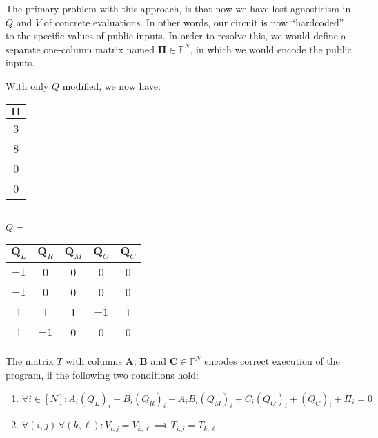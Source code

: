 \documentclass[../lecture-notes.tex]{subfiles}
\begin{document}
The primary problem with this approach, is that now we have lost agnosticism in
$Q$ and $V$ of concrete evaluations. In other words, our circuit is now
``hardcoded'' to the specific values of public inputs. In order to resolve this,
we would define a separate one-column matrix named $\boldsymbol{\Pi} \in \mathbb{F}^N$, in which
we would encode the public inputs.

\begin{example}
With only $Q$ modified, we now have:

\centering 
\begin{center}
\begin{tabular}{|c|}
\hline
\rowcolor{gray!30} $\boldsymbol{\Pi}$ \\ 
\hline
3 \\ 
\hline
8 \\ 
\hline
0 \\ 
\hline
0 \\ 
\hline
\end{tabular} \hspace{1cm}
\\
$Q=$ 
\begin{tabular}{|c|c|c|c|c|}
\hline
\rowcolor{gray!30} $\mathbf{Q}_L$ & $\mathbf{Q}_R$ & $\mathbf{Q}_M$ & $\mathbf{Q}_O$ & $\mathbf{Q}_C$ \\ 
\hline
$-1$ & 0 & 0 & 0 & 0 \\ 
\hline
$-1$ & 0 & 0 & 0 & 0 \\ 
\hline
1 & 1 & 1 & $-1$ & 1 \\ 
\hline
1 & $-1$ & 0 & 0 & 0 \\ 
\hline
\end{tabular}
\end{center}
\end{example}

\begin{proposition}[Wrap-up]\label{prop:plonk-conditions}
The matrix $T$ with columns $\mathbf{A}$, $\mathbf{B}$ and $\mathbf{C} \in \mathbb{F}^N$ encodes correct execution of the program, if the following two conditions hold:
\begin{enumerate}
    \item \(\forall i \in [N]: A_i (Q_{L})_i + B_i(Q_{R})_i + A_i B_i (Q_{M})_i + C_i (Q_{O})_i + (Q_{C})_i + \Pi_i = 0\)
    \item \(\forall (i, j) \, \forall (k, \ell): V_{i,j} = V_{k,\ell} \implies T_{i,j} = T_{k,\ell}\)
\end{enumerate}
\end{proposition}
\end{document}
